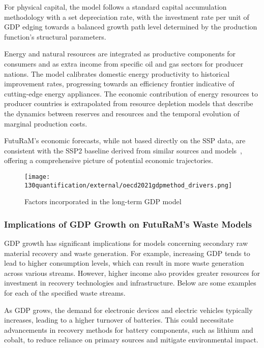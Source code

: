 For physical capital, the model follows a standard capital accumulation methodology with a set depreciation rate, with the investment rate per unit of GDP edging towards a balanced growth path level determined by the production function's structural parameters.

Energy and natural resources are integrated as productive components for consumers and as extra income from specific oil and gas sectors for producer nations. The model calibrates domestic energy productivity to historical improvement rates, progressing towards an efficiency frontier indicative of cutting-edge energy appliances. The economic contribution of energy resources to producer countries is extrapolated from resource depletion models that describe the dynamics between reserves and resources and the temporal evolution of marginal production costs.

FutuRaM's economic forecasts, while not based directly on the SSP data, are consistent with the SSP2 baseline derived from similar sources and models~\cite{ssp2017narrative, jiang2017ssp, leimbach2017ssp, cuaresma2017ssp, dellink2017ssp, samir2017ssp}, offering a comprehensive picture of potential economic trajectories.


\begin{figure}[h!]
  \centering
  \texttt{[image: 130quantification/external/oecd2021gdpmethod\_drivers.png]}
  \caption[Factors incorporated in the long-term GDP model]{Factors incorporated in the long-term GDP model~\cite{oecd2021gdpmethod}}\label{fig:gpd_method}
\end{figure}

\clearpage
\subsubsection{Implications of GDP Growth on FutuRaM's Waste Models}

GDP growth has significant implications for models concerning secondary raw material recovery and waste generation. For example, increasing GDP tends to lead to higher consumption levels, which can result in more waste generation across various streams. However, higher income also provides greater resources for investment in recovery technologies and infrastructure. Below are some examples for each of the specified waste streams.

\wasteSubsubsubsecBATT

As GDP grows, the demand for electronic devices and electric vehicles typically increases, leading to a higher turnover of batteries. This could necessitate advancements in recovery methods for battery components, such as lithium and cobalt, to reduce reliance on primary sources and mitigate environmental impact.

